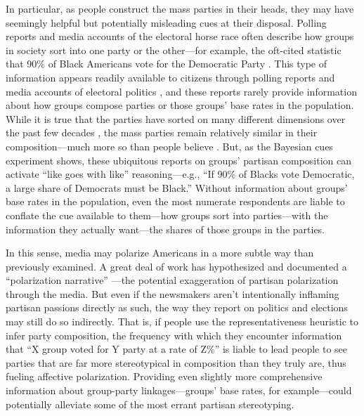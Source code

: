 \documentclass[12pt, letterpaper]{article}
\begin{document}
In particular, as people construct the mass parties in their heads, they may have seemingly helpful but potentially misleading cues at their disposal. Polling reports and media accounts of the electoral horse race often describe how groups in society sort into one party or the other---for example, the oft-cited statistic that 90\% of Black Americans vote for the Democratic Party \citep[e.g.,][]{tyson2018pew}. This type of information appears readily available to citizens through polling reports and media accounts of electoral politics \citep[e.g.,][]{baldassare2019ppic,edsall2019why,fitzsimmons2018record}, and these reports rarely provide information about how groups compose parties or those groups' base rates in the population. While it is true that the parties have sorted on many different dimensions over the past few decades \citep[e.g.,][]{Levendusky2009,mason2018uncivil}, the mass parties remain relatively similar in their composition---much more so than people believe \citep{ahler2018parties}. But, as the Bayesian cues experiment shows, these ubiquitous reports on groups' partisan composition can activate ``like goes with like'' reasoning---e.g., ``If 90\% of Blacks vote Democratic, a large share of Democrats must be Black.'' Without information about groups' base rates in the population, even the most numerate respondents are liable to conflate the cue available to them---how groups sort into parties---with the information they actually want---the shares of those groups in the parties. 

In this sense, media may polarize Americans in a more subtle way than previously examined. A great deal of work has hypothesized and documented a ``polarization narrative'' \citep{FiorinaAbrams2008, LevenduskyMalhotra2013, levendusky2016media}---the potential exaggeration of partisan polarization through the media. But even if the newsmakers aren't intentionally inflaming partisan passions directly as such, the way they report on politics and elections may still do so indirectly. That is, if people use the representativeness heuristic to infer party composition, the frequency with which they encounter information that ``X group voted for Y party at a rate of Z\%'' is liable to lead people to see parties that are far more stereotypical in composition than they truly are, thus fueling affective polarization. Providing even slightly more comprehensive information about group-party linkages---groups' base rates, for example---could potentially alleviate some of the most errant partisan stereotyping.
\end{document}
